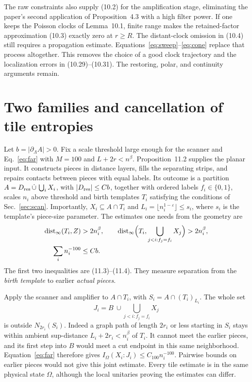 \documentclass[aps,prb,onecolumn,10pt,nofootinbib]{revtex4-2}
\newcommand{\dist}{\operatorname{dist}}
\begin{document}
The raw constraints also supply (10.2) for the amplification stage, eliminating the paper's second application of Proposition~4.3 with a high filter power. If one keeps the Poisson clocks of Lemma~10.1, finite range makes the retained-factor approximation (10.3) exactly zero at $r\ge R$. The distant-clock omission in (10.4) still requires a propagation estimate. Equations~\eqref{eq:sweep}--\eqref{eq:cone} replace that process altogether. This removes the choice of a good clock trajectory and the localization errors in (10.29)--(10.31). The restoring, polar, and continuity arguments remain.

\section{Two families and cancellation of tile entropies}

Let $b=|\partial_\Lambda A|>0$. Fix a scale threshold large enough for the scanner and Eq.~\eqref{eq:far} with $M=100$ and $L+2r<n^\beta$. Proposition~11.2 supplies the planar input. It constructs pieces in distance layers, fills the separating strips, and repairs contacts between pieces with equal labels. Its outcome is a partition $A=D_{\rm res}\,\dot\cup\,\bigcup_i X_i$, with $|D_{\rm res}|\le Cb$, together with ordered labels $f_i\in\{0,1\}$, scales $n_i$ above threshold and birth templates $T_i$ satisfying the conditions of Sec.~\ref{sec:scan}. Importantly, $X_i\subseteq A\cap T_i$ and $L_i=\lfloor n_i^{1-\varepsilon}\rfloor\le s_i$, where $s_i$ is the template's piece-size parameter. The estimates one needs from the geometry are
\begin{align}
 \dist_\infty(T_i,Z)&>2n_i^\beta,\qquad
 \dist_\infty\Bigl(T_i,\bigcup_{j<i:f_j=f_i}X_j\Bigr)>2n_i^\beta,\nonumber\\
 \sum_i n_i^{-100}&\le Cb .
 \label{eq:geom}
\end{align}
The first two inequalities are (11.3)--(11.4). They measure separation from the \emph{birth template} to earlier \emph{actual pieces}.

Apply the scanner and amplifier to $A\cap T_i$, with $S_i=A\cap (T_i)_{L_i}$. The whole set
\[
 J_i=B\ \cup\!\!\bigcup_{j<i:f_j=f_i}X_j
\]
is outside $N_{2r_i}(S_i)$. Indeed a graph path of length $2r_i$ or less starting in $S_i$ stays within ambient sup-distance $L_i+2r_i<n_i^\beta$ of $T_i$. It cannot meet the earlier pieces, and its first step into $B$ would meet a cut endpoint in this same neighborhood. Equation~\eqref{eq:far} therefore gives $I_\Omega(X_i:J_i)\le C_{100} n_i^{-100}$. Pairwise bounds on earlier pieces would not give this joint estimate. Every tile estimate is in the same physical state $\Omega$, although the local unitaries proving the estimates can differ.
\end{document}
